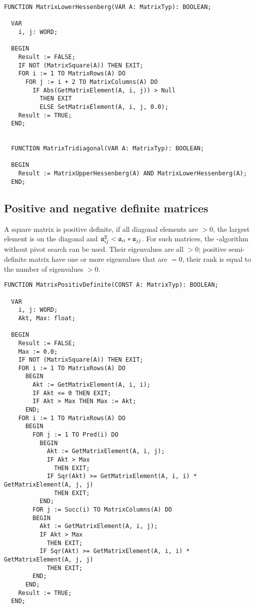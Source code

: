 \begin{refsection}
\begin{lstlisting}[caption=has matrix the upper Hessenberg form?]
  FUNCTION MatrixLowerHessenberg(VAR A: MatrixTyp): BOOLEAN;

  VAR
    i, j: WORD;

  BEGIN
    Result := FALSE;
    IF NOT (MatrixSquare(A)) THEN EXIT;
    FOR i := 1 TO MatrixRows(A) DO
      FOR j := i + 2 TO MatrixColumns(A) DO
        IF Abs(GetMatrixElement(A, i, j)) > Null
          THEN EXIT
          ELSE SetMatrixElement(A, i, j, 0.0);
    Result := TRUE;
  END;


  FUNCTION MatrixTridiagonal(VAR A: MatrixTyp): BOOLEAN;

  BEGIN
    Result := MatrixUpperHessenberg(A) AND MatrixLowerHessenberg(A);
  END;
\end{lstlisting}

\subsection{Positive and negative definite matrices}

A square matrix is positive definite, if all diagonal elements are \(> 0 \), the largest element is on the diagonal and \(\mathfrak{a}_{ij}^2 < \mathfrak{a}_{ii} * \mathfrak{a}_{jj} \). For such matrices, the -algorithm without pivot search can be used. Their eigenvalues are all \(> 0 \); positive semi-definite matrix have one or more eigenvalues that are \(= 0 \), their rank is equal to the number of eigenvalues \(> 0 \).

\begin{lstlisting}[caption=is matrix positive definite?]
  FUNCTION MatrixPositivDefinite(CONST A: MatrixTyp): BOOLEAN;

  VAR
    i, j: WORD;
    Akt, Max: float;

  BEGIN
    Result := FALSE;
    Max := 0.0;
    IF NOT (MatrixSquare(A)) THEN EXIT;
    FOR i := 1 TO MatrixRows(A) DO
      BEGIN
        Akt := GetMatrixElement(A, i, i);
        IF Akt <= 0 THEN EXIT;
        IF Akt > Max THEN Max := Akt;
      END;
    FOR i := 1 TO MatrixRows(A) DO
      BEGIN
        FOR j := 1 TO Pred(i) DO
          BEGIN
            Akt := GetMatrixElement(A, i, j);
            IF Akt > Max
              THEN EXIT;
            IF Sqr(Akt) >= GetMatrixElement(A, i, i) * GetMatrixElement(A, j, j)
              THEN EXIT;
          END;
        FOR j := Succ(i) TO MatrixColumns(A) DO
        BEGIN
          Akt := GetMatrixElement(A, i, j);
          IF Akt > Max
            THEN EXIT;
          IF Sqr(Akt) >= GetMatrixElement(A, i, i) * GetMatrixElement(A, j, j)
            THEN EXIT;
        END;
      END;
    Result := TRUE;
  END;
\end{lstlisting}



\end{refsection}
